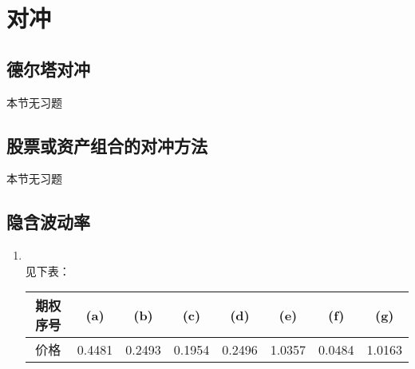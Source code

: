 \section{对冲}
\subsection{德尔塔对冲}
本节无习题
\subsection{股票或资产组合的对冲方法}
本节无习题
\subsection{隐含波动率}
\begin{enumerate}
    \item \sol\\
    见下表：
    \begin{table}[H]
        \centering
        \begin{tabular}{|c|c|c|c|c|c|c|c|}
            \hline
            期权序号 & (a) & (b) & (c) & (d) & (e) & (f) & (g) \\ \hline
            价格 & 0.4481  &  0.2493  &  0.1954  &  0.2496  &  1.0357  &  0.0484  &  1.0163 \\ \hline
        \end{tabular}
    \end{table}
\end{enumerate}
